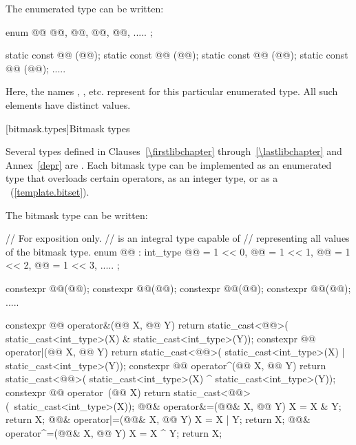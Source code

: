 \pnum
The enumerated type  can be written:

\begin{codeblock}
enum @@ { @@, @@, @@, @@, ..... };

static const @@ (@@);
static const @@ (@@);
static const @@ (@@);
static const @@ (@@);
  .....
\end{codeblock}

\pnum
Here, the names , , etc. represent
for this particular enumerated type.
%
All such elements have distinct values.

[bitmask.types]{Bitmask types}

\pnum
Several types defined in Clauses~\ref{\firstlibchapter} through~\ref{\lastlibchapter}
and Annex~\ref{depr} are
.
%
Each bitmask type can be implemented as an
enumerated type that overloads certain operators, as an integer type,
or as a
~(\ref{template.bitset}).
%

\pnum
The bitmask type  can be written:

\begin{codeblock}
// For exposition only.
//  is an integral type capable of
// representing all values of the bitmask type.
enum @@ : int_type {
  @@ = 1 << 0, @@ = 1 << 1, @@ = 1 << 2, @@ = 1 << 3, .....
};

constexpr @@(@@);
constexpr @@(@@);
constexpr @@(@@);
constexpr @@(@@);
  .....

constexpr @@ operator&(@@ X, @@ Y) {
  return static_cast<@@>(
    static_cast<int_type>(X) & static_cast<int_type>(Y));
}
constexpr @@ operator|(@@ X, @@ Y) {
  return static_cast<@@>(
    static_cast<int_type>(X) | static_cast<int_type>(Y));
}
constexpr @@ operator^(@@ X, @@ Y){
  return static_cast<@@>(
    static_cast<int_type>(X) ^ static_cast<int_type>(Y));
}
constexpr @@ operator~(@@ X){
  return static_cast<@@>(~static_cast<int_type>(X));
}
@@& operator&=(@@& X, @@ Y){
  X = X & Y; return X;
}
@@& operator|=(@@& X, @@ Y) {
  X = X | Y; return X;
}
@@& operator^=(@@& X, @@ Y) {
  X = X ^ Y; return X;
}
\end{codeblock}

